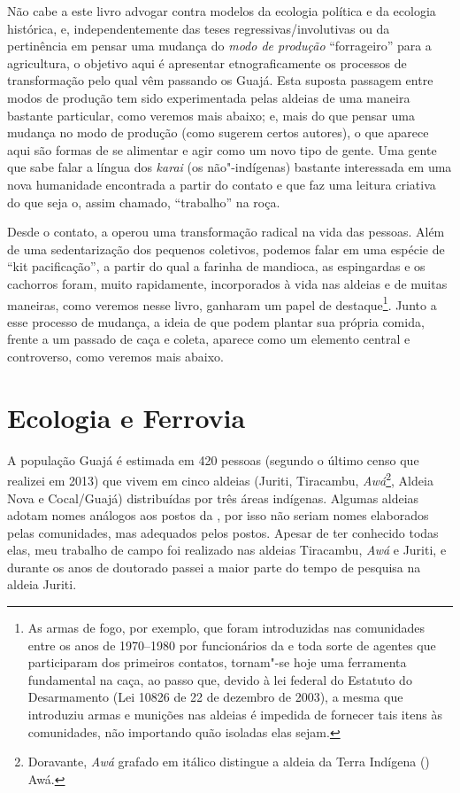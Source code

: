 Não cabe a este livro advogar contra modelos da ecologia política e da
ecologia histórica, e, independentemente das teses
regressivas/involutivas ou da pertinência em pensar uma mudança do
\emph{modo de produção} ``forrageiro'' para a agricultura, o objetivo
aqui é apresentar etnograficamente os processos de transformação pelo
qual vêm passando os Guajá. Esta suposta passagem entre modos de
produção tem sido experimentada pelas aldeias de uma maneira bastante
particular, como veremos mais abaixo; e, mais do que pensar uma mudança
no modo de produção (como sugerem certos autores), o que aparece aqui
são formas de se alimentar e agir como um novo tipo de gente. Uma gente
que sabe falar a língua dos \emph{karai} (os não"-indígenas) bastante
interessada em uma nova humanidade encontrada a partir do contato e que
faz uma leitura criativa do que seja o, assim chamado, ``trabalho'' na
roça.

Desde o contato, a  operou uma transformação radical na vida das
pessoas. Além de uma sedentarização dos pequenos coletivos, podemos
falar em uma espécie de ``kit pacificação'', a partir do qual a farinha
de mandioca, as espingardas e os cachorros foram, muito rapidamente,
incorporados à vida nas aldeias e de muitas maneiras, como veremos nesse
livro, ganharam um papel de destaque\footnote{As armas de fogo, por
  exemplo, que foram introduzidas nas comunidades entre os anos de
  1970--1980 por funcionários da  e toda sorte de agentes que
  participaram dos primeiros contatos, tornam"-se hoje uma ferramenta
  fundamental na caça, ao passo que, devido à lei federal do Estatuto do
  Desarmamento (Lei 10826 de 22 de dezembro de 2003), a mesma  que
  introduziu armas e munições nas aldeias é impedida de fornecer tais
  itens às comunidades, não importando quão isoladas elas sejam.}. Junto
a esse processo de mudança, a ideia de que podem plantar sua própria
comida, frente a um passado de caça e coleta, aparece como um elemento
central e controverso, como veremos mais abaixo.

\section{Ecologia e Ferrovia }

A população Guajá é estimada em 420 pessoas (segundo o último censo que
realizei em 2013) que vivem em cinco aldeias (Juriti, Tiracambu,
\emph{Awá}\footnote{Doravante, \emph{Awá} grafado em itálico distingue a aldeia da Terra Indígena () Awá.}, Aldeia Nova e Cocal/Guajá) distribuídas por três áreas
indígenas. Algumas aldeias adotam nomes análogos aos postos da ,
por isso não seriam nomes elaborados pelas comunidades, mas adequados
pelos postos. Apesar de ter conhecido todas elas, meu trabalho de campo
foi realizado nas aldeias Tiracambu, \emph{Awá} e Juriti, e durante os
anos de doutorado passei a maior parte do tempo de pesquisa na aldeia
Juriti.

